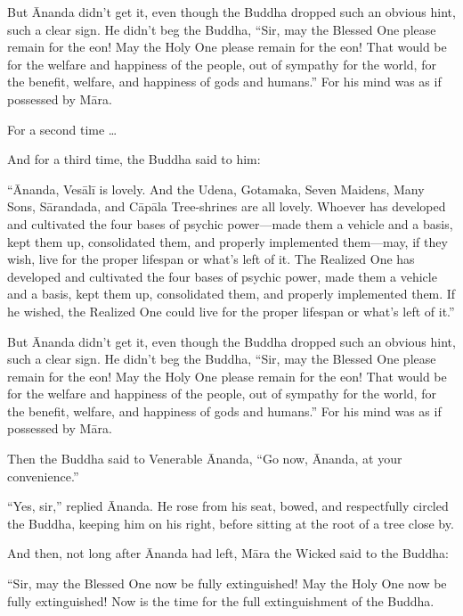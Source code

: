 \documentclass[12pt,openany]{book}%
\begin{document}
But Ānanda didn’t get it, even though the Buddha dropped such an obvious hint, such a clear sign. He didn’t beg the Buddha, “Sir, may the Blessed One please remain for the eon! May the Holy One please remain for the eon! That would be for the welfare and happiness of the people, out of sympathy for the world, for the benefit, welfare, and happiness of gods and humans.” For his mind was as if possessed by \textsanskrit{Māra}. 

For a second time … 

And for a third time, the Buddha said to him: 

“Ānanda, \textsanskrit{Vesālī} is lovely. And the Udena, Gotamaka, Seven Maidens, Many Sons, \textsanskrit{Sārandada}, and \textsanskrit{Cāpāla} Tree-shrines are all lovely. Whoever has developed and cultivated the four bases of psychic power—made them a vehicle and a basis, kept them up, consolidated them, and properly implemented them—may, if they wish, live for the proper lifespan or what’s left of it. The Realized One has developed and cultivated the four bases of psychic power, made them a vehicle and a basis, kept them up, consolidated them, and properly implemented them. If he wished, the Realized One could live for the proper lifespan or what’s left of it.” 

But Ānanda didn’t get it, even though the Buddha dropped such an obvious hint, such a clear sign. He didn’t beg the Buddha, “Sir, may the Blessed One please remain for the eon! May the Holy One please remain for the eon! That would be for the welfare and happiness of the people, out of sympathy for the world, for the benefit, welfare, and happiness of gods and humans.” For his mind was as if possessed by \textsanskrit{Māra}. 

Then the Buddha said to Venerable Ānanda, “Go now, Ānanda, at your convenience.” 

“Yes, sir,” replied Ānanda. He rose from his seat, bowed, and respectfully circled the Buddha, keeping him on his right, before sitting at the root of a tree close by. 

And then, not long after Ānanda had left, \textsanskrit{Māra} the Wicked said to the Buddha: 

“Sir, may the Blessed One now be fully extinguished! May the Holy One now be fully extinguished! Now is the time for the full extinguishment of the Buddha. 
\end{document}
